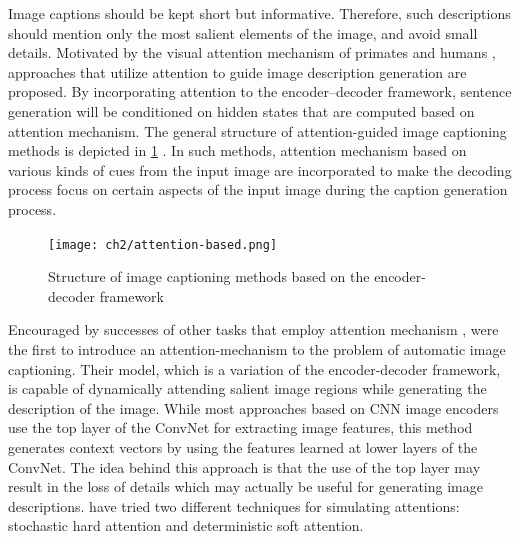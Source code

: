 Image captions should be kept short but informative. Therefore, such descriptions should mention only the most salient elements of the image, and avoid small details. Motivated by the visual attention mechanism of primates and humans \citep{Rensink2000, Spratling2004} , approaches that utilize attention to guide image description generation are proposed. By incorporating attention to the encoder–decoder framework, sentence generation will be conditioned on hidden states that are computed based on attention mechanism. The general structure of attention-guided image captioning methods is depicted in \cref{fig:attention-based} . In such methods, attention mechanism based on various kinds of cues from the input image are incorporated to make the decoding process focus on certain aspects of the input image during the caption generation process.

\begin{figure}[hpt]
	\centering
	\texttt{[image: ch2/attention-based.png]}
	\caption{Structure of image captioning methods based on the encoder-decoder framework}
	\label{fig:attention-based}
\end{figure}

Encouraged by successes of other tasks that employ attention mechanism \citet{Mnih2014, LeiBa2015}, \citet{Xu2015} were the first to introduce an attention-mechanism to the problem of automatic image captioning. Their model, which is a variation of the encoder-decoder framework, is capable of dynamically attending salient image regions while generating the description of the image. While most approaches based on CNN image encoders use the top layer of the ConvNet for extracting image features, this method generates context vectors by using the features learned at lower layers of the ConvNet. The idea behind this approach is that the use of the top layer may result in the loss of details which may actually be useful for generating image descriptions. \citeauthor{Xu2015} have tried two different techniques for simulating attentions: stochastic hard attention and deterministic soft attention.

